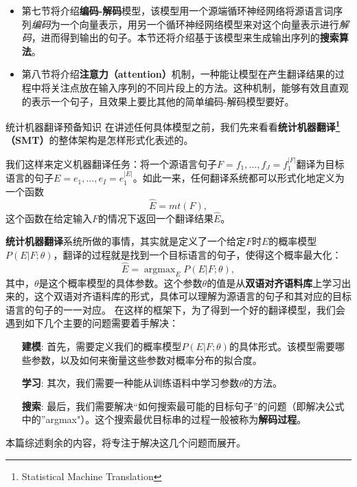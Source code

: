 \documentclass[10pt,a4paper]{ctexart}
\makeatletter
\renewcommand{\section}{\@startsection{section}{1}{0mm}
  {-\baselineskip}{0.5\baselineskip}{\bf\leftline}}
\makeatother
\begin{document}
\begin{itemize}
\item 第七节将介绍\textbf{编码-解码}模型，该模型用一个源端循环神经网络将源语言词序列\textit{编码}为一个向量表示，用另一个循环神经网络模型来对这个向量表示进行\textit{解码}，进而得到输出的句子。本节还将介绍基于该模型来生成输出序列的\textbf{搜索算法}。
\item 第八节将介绍\textbf{注意力（attention）}机制，一种能让模型在产生翻译结果的过程中将关注点放在输入序列的不同片段上的方法。这种机制，能够有效且直观的表示一个句子，且效果上要比其他的简单编码-解码模型要好。
\end{itemize}

\section{统计机器翻译预备知识}
在讲述任何具体模型之前，我们先来看看\textbf{统计机器翻译\footnote{Statistical Machine Translation}（SMT）}\cite{brown1993mathematics}的整体架构是怎样形式化表述的。

我们这样来定义机器翻译任务：将一个源语言句子$F = f_1,...,f_J = f_1^{|F|}$翻译为目标语言的句子$E = e_1,...,e_I = e_1^{|E|}$。如此一来，任何翻译系统都可以形式化地定义为一个函数
\[
  \hat{E} = mt(F),
\]
这个函数在给定输入$F$的情况下返回一个翻译结果$\hat{E}$。

\textbf{统计机器翻译}系统所做的事情，其实就是定义了一个给定$F$时$E$的概率模型$P(E|F;\theta)$，翻译的过程就是找到一个目标语言的句子，使得这个概率最大化：
\[
 \hat{E} = \mathop{\arg\max}_{E} P(E|F;\theta),
\]
其中，$\theta$是这个概率模型的具体参数。这个参数$\theta$的值是从\textbf{双语对齐语料库}上学习出来的，这个双语对齐语料库的形式，具体可以理解为源语言的句子和其对应的目标语言的句子的一一对应。
在这样的框架下，为了得到一个好的翻译模型，我们会遇到如下几个主要的问题需要着手解决：
\begin{enumerate}
\item[\textbf{建模}:] 首先，需要定义我们的概率模型$P(E | F;\theta)$的具体形式。该模型需要哪些参数，以及如何来衡量这些参数对概率分布的拟合度。
\item[\textbf{学习}:] 其次，我们需要一种能从训练语料中学习参数$\theta$的方法。
\item[\textbf{搜索}:] 最后，我们需要解决“如何搜索最可能的目标句子”的问题（即解决公式中的''argmax"）。这个搜索最优目标串的过程一般被称为\textbf{解码过程}。
\end{enumerate}

本篇综述剩余的内容，将专注于解决这几个问题而展开。
\end{document}
